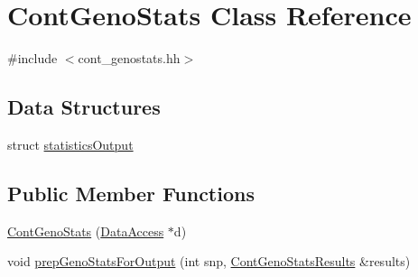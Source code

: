 \hypertarget{classContGenoStats}{
\section{ContGenoStats Class Reference}
\label{classContGenoStats}
}


{\ttfamily \#include $<$cont\_\-genostats.hh$>$}

\subsection*{Data Structures}
\begin{DoxyCompactItemize}
\item 
struct \hyperlink{structContGenoStats_1_1statisticsOutput}{statisticsOutput}
\end{DoxyCompactItemize}
\subsection*{Public Member Functions}
\begin{DoxyCompactItemize}
\item 
\hyperlink{classContGenoStats_a63e8c1b4f83723b05dfc7be462b438dc}{ContGenoStats} (\hyperlink{classDataAccess}{DataAccess} $\ast$d)
\item 
void \hyperlink{classContGenoStats_a4b6add4b82e3f7b49594007e8de252e2}{prepGenoStatsForOutput} (int snp, \hyperlink{structContGenoStatsResults}{ContGenoStatsResults} \&results)
\end{DoxyCompactItemize}
